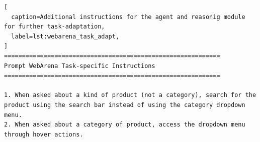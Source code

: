 \begin{lstlisting}[
  caption=Additional instructions for the agent and reasonig module for further task-adaptation,
  label=lst:webarena_task_adapt,
]
============================================================
Prompt WebArena Task-specific Instructions
============================================================

1. When asked about a kind of product (not a category), search for the product using the search bar instead of using the category dropdown menu.
2. When asked about a category of product, access the dropdown menu through hover actions.
\end{lstlisting}